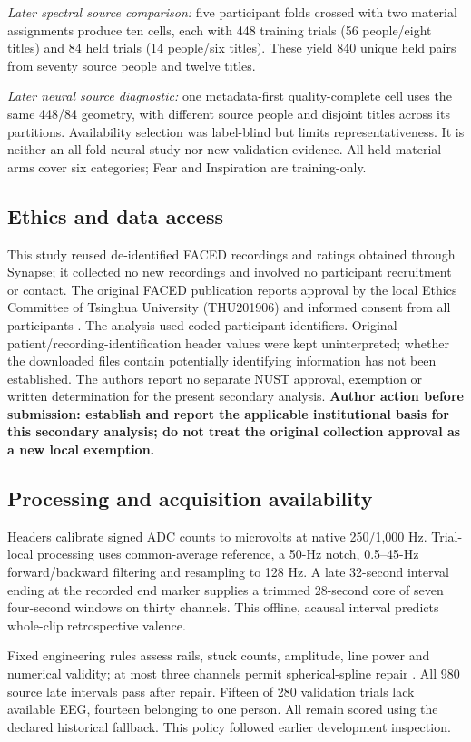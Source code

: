 \documentclass[10pt,letterpaper]{article}
\begin{document}
\textit{Later spectral source comparison:} five participant folds crossed with two material assignments produce ten cells, each with 448 training trials (56 people/eight titles) and 84 held trials (14 people/six titles). These yield 840 unique held pairs from seventy source people and twelve titles.

\textit{Later neural source diagnostic:} one metadata-first quality-complete cell uses the same 448/84 geometry, with different source people and disjoint titles across its partitions. Availability selection was label-blind but limits representativeness. It is neither an all-fold neural study nor new validation evidence. All held-material arms cover six categories; Fear and Inspiration are training-only.

\subsection{Ethics and data access}
This study reused de-identified FACED recordings and ratings obtained through Synapse; it collected no new recordings and involved no participant recruitment or contact. The original FACED publication reports approval by the local Ethics Committee of Tsinghua University (THU201906) and informed consent from all participants \cite{chen2023faced}. The analysis used coded participant identifiers. Original patient/recording-identification header values were kept uninterpreted; whether the downloaded files contain potentially identifying information has not been established. The authors report no separate NUST approval, exemption or written determination for the present secondary analysis. \textbf{Author action before submission: establish and report the applicable institutional basis for this secondary analysis; do not treat the original collection approval as a new local exemption.}

\subsection{Processing and acquisition availability}
Headers calibrate signed ADC counts to microvolts at native 250/1,000 Hz. Trial-local processing uses common-average reference, a 50-Hz notch, 0.5--45-Hz forward/backward filtering and resampling to 128 Hz. A late 32-second interval ending at the recorded end marker supplies a trimmed 28-second core of seven four-second windows on thirty channels. This offline, acausal interval predicts whole-clip retrospective valence.

Fixed engineering rules assess rails, stuck counts, amplitude, line power and numerical validity; at most three channels permit spherical-spline repair \cite{perrin1989spherical}. All 980 source late intervals pass after repair. Fifteen of 280 validation trials lack available EEG, fourteen belonging to one person. All remain scored using the declared historical fallback. This policy followed earlier development inspection.
\end{document}
